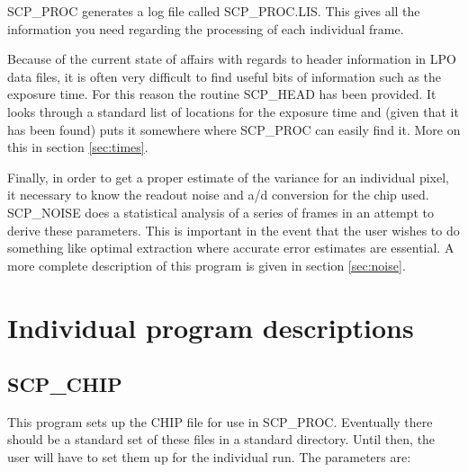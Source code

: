 SCP\_PROC generates a log file called SCP\_PROC.LIS.  This gives all the
information you need regarding the processing of each individual frame.

Because of the current state of affairs with regards to header information in
LPO data files, it is often very difficult to find useful bits of information
such as the exposure time.  For this reason the routine SCP\_HEAD has been
provided.  It looks through a standard list of locations for the exposure time
and (given that it has been found) puts it somewhere where SCP\_PROC can easily
find it.  More on this in section \ref{sec:times}.

Finally, in order to get a proper estimate of the variance for an individual
pixel, it necessary to know the readout noise and a/d conversion for the chip
used.  SCP\_NOISE does a statistical analysis of a series of frames in an
attempt to derive these parameters.  This is important in the event that the
user wishes to do something like optimal extraction where accurate error
estimates are essential. A more complete description of this program is given
in section \ref{sec:noise}.

\section{Individual program descriptions}

\subsection{SCP\_CHIP} \label{sec:chip_pars}

This program sets up the CHIP file for use in SCP\_PROC.
Eventually there should be a standard set of these files in a standard
directory.  Until then, the user will have to set them up for the
individual run. The parameters are:


